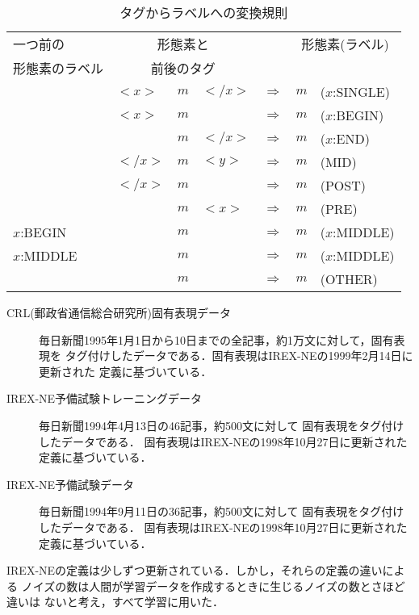   \begin{table}[htbp]
    \begin{center}
      \caption{タグからラベルへの変換規則}
      \label{table:trans_rule2} 
      \begin{tabular}[c]{|llclcr@{ }l|}
        \hline
        一つ前の & \multicolumn{3}{c}{形態素と}
        & & \multicolumn{2}{c|}{形態素(ラベル)} \\
        形態素のラベル & \multicolumn{3}{c}{前後のタグ} & & & \\
        \hline
        & $<x>$ & $m$ & $</x>$ & $\Rightarrow$ & $m$ & ($x$:SINGLE) \\
        & $<x>$ & $m$ & & $\Rightarrow$ & $m$ & ($x$:BEGIN) \\
        & & $m$ & $</x>$ & $\Rightarrow$ & $m$ & ($x$:END) \\
        & $</x>$ & $m$ & $<y>$ & $\Rightarrow$ & $m$ & (MID) \\
        & $</x>$ & $m$ & & $\Rightarrow$ & $m$ & (POST) \\
        & & $m$ & $<x>$ & $\Rightarrow$ & $m$ & (PRE) \\
        $x$:BEGIN & & $m$ & & $\Rightarrow$ & $m$ & ($x$:MIDDLE) \\
        $x$:MIDDLE & & $m$ & & $\Rightarrow$ & $m$ & ($x$:MIDDLE) \\
        & & $m$ & & $\Rightarrow$ & $m$ & (OTHER) \\
        \hline
      \end{tabular}
    \end{center}
  \end{table}

\begin{description}
\item[CRL(郵政省通信総合研究所)固有表現データ] 
  毎日新聞1995年1月1日から10日までの全記事，約1万文に対して，固有表現を
  タグ付けしたデータである．固有表現はIREX-NEの1999年2月14日に更新された
  定義に基づいている．
\item[IREX-NE予備試験トレーニングデータ] 
  毎日新聞1994年4月13日の46記事，約500文に対して
  固有表現をタグ付けしたデータである．
  固有表現はIREX-NEの1998年10月27日に更新された定義に基づいている．
\item[IREX-NE予備試験データ] 
  毎日新聞1994年9月11日の36記事，約500文に対して
  固有表現をタグ付けしたデータである．
  固有表現はIREX-NEの1998年10月27日に更新された定義に基づいている．
\end{description}

IREX-NEの定義は少しずつ更新されている．しかし，それらの定義の違いによる
ノイズの数は人間が学習データを作成するときに生じるノイズの数とさほど違いは
ないと考え，すべて学習に用いた．

